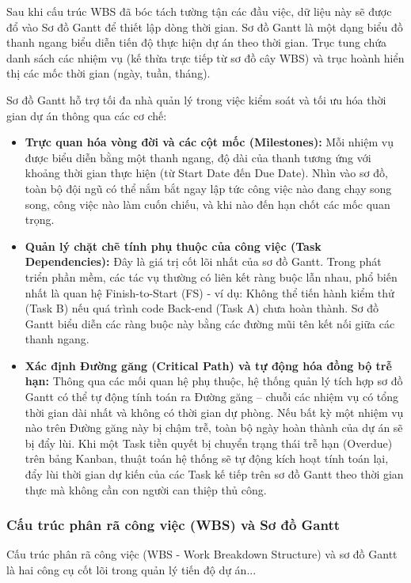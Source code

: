 \documentclass[a4paper,13.5pt]{extreport}
\begin{document}
Sau khi cấu trúc WBS đã bóc tách tường tận các đầu việc, dữ liệu này sẽ được đổ vào Sơ đồ Gantt để thiết lập dòng thời gian. Sơ đồ Gantt là một dạng biểu đồ thanh ngang biểu diễn tiến độ thực hiện dự án theo thời gian. Trục tung chứa danh sách các nhiệm vụ (kế thừa trực tiếp từ sơ đồ cây WBS) và trục hoành hiển thị các mốc thời gian (ngày, tuần, tháng).

Sơ đồ Gantt hỗ trợ tối đa nhà quản lý trong việc kiểm soát và tối ưu hóa thời gian dự án thông qua các cơ chế:
\begin{itemize}
    \item \textbf{Trực quan hóa vòng đời và các cột mốc (Milestones):} Mỗi nhiệm vụ được biểu diễn bằng một thanh ngang, độ dài của thanh tương ứng với khoảng thời gian thực hiện (từ Start Date đến Due Date). Nhìn vào sơ đồ, toàn bộ đội ngũ có thể nắm bắt ngay lập tức công việc nào đang chạy song song, công việc nào làm cuốn chiếu, và khi nào đến hạn chốt các mốc quan trọng.
    \item \textbf{Quản lý chặt chẽ tính phụ thuộc của công việc (Task Dependencies):} Đây là giá trị cốt lõi nhất của sơ đồ Gantt. Trong phát triển phần mềm, các tác vụ thường có liên kết ràng buộc lẫn nhau, phổ biến nhất là quan hệ Finish-to-Start (FS) - ví dụ: Không thể tiến hành kiểm thử (Task B) nếu quá trình code Back-end (Task A) chưa hoàn thành. Sơ đồ Gantt biểu diễn các ràng buộc này bằng các đường mũi tên kết nối giữa các thanh ngang.
    \item \textbf{Xác định Đường găng (Critical Path) và tự động hóa đồng bộ trễ hạn:} Thông qua các mối quan hệ phụ thuộc, hệ thống quản lý tích hợp sơ đồ Gantt có thể tự động tính toán ra Đường găng – chuỗi các nhiệm vụ có tổng thời gian dài nhất và không có thời gian dự phòng. Nếu bất kỳ một nhiệm vụ nào trên Đường găng này bị chậm trễ, toàn bộ ngày hoàn thành của dự án sẽ bị đẩy lùi. Khi một Task tiền quyết bị chuyển trạng thái trễ hạn (Overdue) trên bảng Kanban, thuật toán hệ thống sẽ tự động kích hoạt tính toán lại, đẩy lùi thời gian dự kiến của các Task kế tiếp trên sơ đồ Gantt theo thời gian thực mà không cần con người can thiệp thủ công.
\end{itemize}

\subsubsection{Cấu trúc phân rã công việc (WBS) và Sơ đồ Gantt}
Cấu trúc phân rã công việc (WBS - Work Breakdown Structure) và sơ đồ Gantt là hai công cụ cốt lõi trong quản lý tiến độ dự án...
\end{document}
